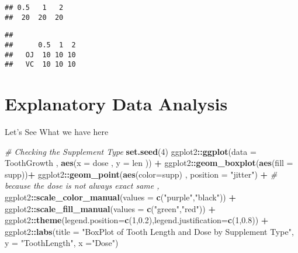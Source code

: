 \documentclass[
]{article}
\newenvironment{Shaded}{\begin{snugshade}}{\end{snugshade}}
\newcommand{\CommentTok}[1]{\textcolor[rgb]{0.56,0.35,0.01}{\textit{#1}}}
\newcommand{\DataTypeTok}[1]{\textcolor[rgb]{0.13,0.29,0.53}{#1}}
\newcommand{\DecValTok}[1]{\textcolor[rgb]{0.00,0.00,0.81}{#1}}
\newcommand{\FloatTok}[1]{\textcolor[rgb]{0.00,0.00,0.81}{#1}}
\newcommand{\KeywordTok}[1]{\textcolor[rgb]{0.13,0.29,0.53}{\textbf{#1}}}
\newcommand{\NormalTok}[1]{#1}
\newcommand{\OperatorTok}[1]{\textcolor[rgb]{0.81,0.36,0.00}{\textbf{#1}}}
\newcommand{\StringTok}[1]{\textcolor[rgb]{0.31,0.60,0.02}{#1}}
\begin{document}
\begin{verbatim}
## 0.5   1   2 
##  20  20  20
\end{verbatim}

\begin{Shaded}
\end{Shaded}

\begin{verbatim}
##     
##      0.5  1  2
##   OJ  10 10 10
##   VC  10 10 10
\end{verbatim}

\hypertarget{explanatory-data-analysis}{%
\section{Explanatory Data Analysis}\label{explanatory-data-analysis}}

Let's See What we have here

\begin{Shaded}
\begin{Highlighting}[]
\CommentTok{\# Checking the Supplement Type}
\KeywordTok{set.seed}\NormalTok{(}\DecValTok{4}\NormalTok{)}
\NormalTok{ggplot2}\OperatorTok{::}\KeywordTok{ggplot}\NormalTok{(}\DataTypeTok{data =}\NormalTok{ ToothGrowth , }\KeywordTok{aes}\NormalTok{(}\DataTypeTok{x =}\NormalTok{ dose , }\DataTypeTok{y =}\NormalTok{ len )) }\OperatorTok{+}\StringTok{ }
\StringTok{        }\NormalTok{ggplot2}\OperatorTok{::}\KeywordTok{geom\_boxplot}\NormalTok{(}\KeywordTok{aes}\NormalTok{(}\DataTypeTok{fill =}\NormalTok{ supp))}\OperatorTok{+}
\StringTok{        }\NormalTok{ggplot2}\OperatorTok{::}\KeywordTok{geom\_point}\NormalTok{(}\KeywordTok{aes}\NormalTok{(}\DataTypeTok{color=}\NormalTok{supp) , }\DataTypeTok{position =} \StringTok{"jitter"}\NormalTok{) }\OperatorTok{+}\StringTok{ }\CommentTok{\# because the dose is not always exact same , }
\StringTok{        }\NormalTok{ggplot2}\OperatorTok{::}\KeywordTok{scale\_color\_manual}\NormalTok{(}\DataTypeTok{values =} \KeywordTok{c}\NormalTok{(}\StringTok{"purple"}\NormalTok{,}\StringTok{"black"}\NormalTok{)) }\OperatorTok{+}\StringTok{ }
\StringTok{        }\NormalTok{ggplot2}\OperatorTok{::}\KeywordTok{scale\_fill\_manual}\NormalTok{(}\DataTypeTok{values =} \KeywordTok{c}\NormalTok{(}\StringTok{"green"}\NormalTok{,}\StringTok{"red"}\NormalTok{)) }\OperatorTok{+}
\StringTok{        }\NormalTok{ggplot2}\OperatorTok{::}\KeywordTok{theme}\NormalTok{(}\DataTypeTok{legend.position=}\KeywordTok{c}\NormalTok{(}\DecValTok{1}\NormalTok{,}\FloatTok{0.2}\NormalTok{),}\DataTypeTok{legend.justification=}\KeywordTok{c}\NormalTok{(}\DecValTok{1}\NormalTok{,}\FloatTok{0.8}\NormalTok{)) }\OperatorTok{+}
\StringTok{        }\NormalTok{ggplot2}\OperatorTok{::}\KeywordTok{labs}\NormalTok{(}\DataTypeTok{title =} \StringTok{"BoxPlot of Tooth Length and Dose by Supplement Type"}\NormalTok{, }\DataTypeTok{y =} \StringTok{"ToothLength"}\NormalTok{, }\DataTypeTok{x =}\StringTok{"Dose"}\NormalTok{)}
\end{Highlighting}
\end{Shaded}
\end{document}
